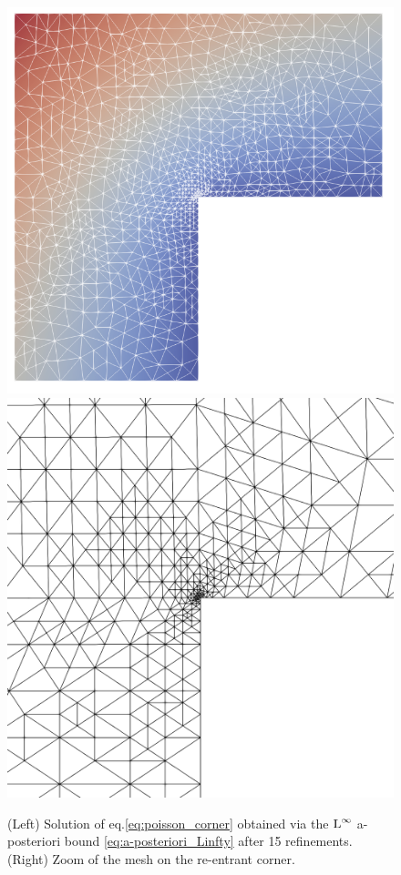 \documentclass[a4paper,11pt]{article}
\begin{document}
{\begin{figure}[h!]\label{fig:h-ref_infty}
 \centering
  \includegraphics[width=0.36\linewidth]{Images/Test1/h-adaptive/u_final.png}
  \includegraphics[width=0.35\linewidth]{Images/Test1/h-adaptive/u_Linfty.png}
\caption{(Left) Solution of eq.\eqref{eq:poisson_corner}  obtained via the $\operatorname L^{\infty}$ a-posteriori bound \eqref{eq:a-posteriori_Linfty} after 15 refinements. (Right) Zoom of the mesh on the re-entrant corner.}

\end{figure}

}
\end{document}
